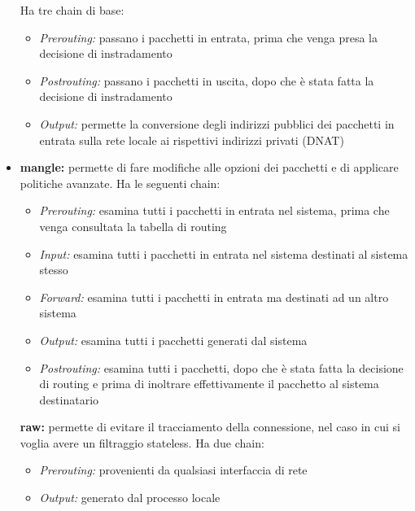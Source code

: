 \begin{itemize}
    \noindent Ha tre chain di base:
    \begin{itemize}
        \item \textit{Prerouting:} passano i pacchetti in entrata, prima che venga presa la 
        decisione di instradamento 
        \item \textit{Postrouting:} passano i pacchetti in uscita, dopo che è stata fatta la decisione 
        di instradamento
        \item \textit{Output:} permette la conversione degli indirizzi pubblici dei pacchetti in entrata sulla rete locale ai rispettivi indirizzi privati (DNAT) 
    \end{itemize}
    \item \textbf{mangle:} permette di fare modifiche alle opzioni dei pacchetti e di applicare politiche avanzate. Ha le seguenti chain:
    \begin{itemize}
        \item \textit{Prerouting:} esamina tutti i pacchetti in entrata nel sistema, prima che venga consultata la tabella di routing 
        \item \textit{Input:} esamina tutti i pacchetti in entrata nel sistema destinati al sistema stesso 
        \item \textit{Forward:} esamina tutti i pacchetti in entrata ma destinati ad un altro sistema
        \item \textit{Output:} esamina tutti i pacchetti generati dal sistema 
        \item \textit{Postrouting:} esamina tutti i pacchetti, dopo che è stata fatta la decisione di routing e prima di inoltrare effettivamente il pacchetto al sistema destinatario
    \end{itemize}
    \textbf{raw:} permette di evitare il tracciamento della connessione, nel caso in cui 
    si voglia avere un filtraggio stateless. Ha due chain:
    \begin{itemize}
        \item \textit{Prerouting:} provenienti da qualsiasi interfaccia di rete 
        \item \textit{Output:} generato dal processo locale
    \end{itemize}
\end{itemize}

